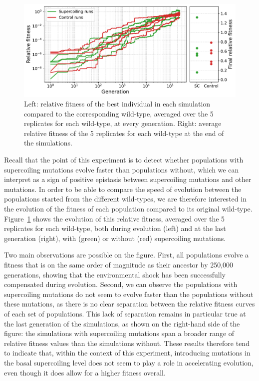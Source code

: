 \begin{figure}
\includegraphics[width=\textwidth]{epistasis/img/rel_fitness_sc_control.pdf}
\caption[Average relative fitness to the ancestor, during evolution after an environmental shock]{Left: relative fitness of the best individual in each simulation compared to the corresponding wild-type, averaged over the 5 replicates for each wild-type, at every generation.
Right: average relative fitness of the 5 replicates for each wild-type at the end of the simulations.}
\label{fig:epistasis:rel-fitness}
\end{figure}

Recall that the point of this experiment is to detect whether populations with supercoiling mutations evolve faster than populations without, which we can interpret as a sign of positive epistasis between supercoiling mutations and other mutations.
In order to be able to compare the speed of evolution between the populations started from the different wild-types, we are therefore interested in the evolution of the fitness of each population compared to its original wild-type.
Figure~\ref{fig:epistasis:rel-fitness} shows the evolution of this relative fitness, averaged over the 5 replicates for each wild-type, both during evolution (left) and at the last generation (right), with (green) or without (red) supercoiling mutations.

Two main observations are possible on the figure.
First, all populations evolve a fitness that is on the same order of magnitude as their ancestor by 250,000 generations, showing that the environmental shock has been successfully compensated during evolution.
Second, we can observe the populations with supercoiling mutations do not seem to evolve faster than the populations without these mutations, as there is no clear separation between the relative fitness curves of each set of populations.
This lack of separation remains in particular true at the last generation of the simulations, as shown on the right-hand side of the figure: the simulations with supercoiling mutations span a broader range of relative fitness values than the simulations without.
These results therefore tend to indicate that, within the context of this experiment, introducing mutations in the basal supercoiling level does not seem to play a role in accelerating evolution, even though it does allow for a higher fitness overall.


